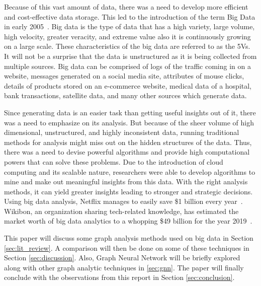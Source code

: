 \documentclass[journal,twoside,web]{ieeecolor}
\begin{document}
Because of this vast amount of data, there was a need to develop more efficient and cost-effective data storage. This led to the introduction of the term Big Data in early 2005~\cite{4}. Big data is the type of data that has a high variety, large volume, high velocity, greater veracity, and extreme value also it is continuously growing on a large scale. These characteristics of the big data are referred to as the 5Vs. It will not be a surprise that the data is unstructured as it is being collected from multiple sources. Big data can be comprised of logs of the traffic coming in on a website, messages generated on a social media site, attributes of mouse clicks, details of products stored on an e-commerce website, medical data of a hospital, bank transactions, satellite data, and many other sources which generate data.

Since generating data is an easier task than getting useful insights out of it, there was a need to emphasize on its analysis. But because of the sheer volume of high dimensional, unstructured, and highly inconsistent data, running traditional methods for analysis might miss out on the hidden structures of the data. Thus, there was a need to devise powerful algorithms and provide high computational powers that can solve these problems. Due to the introduction of cloud computing and its scalable nature, researchers were able to develop algorithms to mine and make out meaningful insights from this data. With the right analysis methods, it can yield greater insights leading to stronger and strategic decisions. Using big data analysis, Netflix manages to easily save \$1 billion every year~\cite{5}. Wikibon, an organization sharing tech-related knowledge, has estimated the market worth of big data analytics to a whopping \$49 billion for the year 2019~\cite{6}.



This paper will discuss some graph analysis methods used on big data in Section \ref{sec:lit_review}. A comparison will then be done on some of these techniques in Section \ref{sec:discussion}. Also, Graph Neural Network will be briefly explored along with other graph analytic techniques in \ref{sec:gnn}. The paper will finally conclude with the observations from this report in Section \ref{sec:conclusion}.
\end{document}
